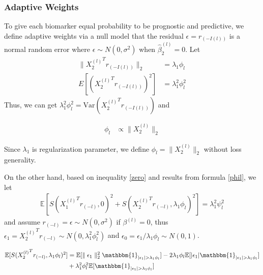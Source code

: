 \documentclass[12pt]{article}
\begin{document}
\subsubsection*{Adaptive Weights}

To give each biomarker equal probability to be prognostic and predictive,
we define adaptive weights via a null model that the residual $\epsilon=r_{(-I(l))}$ 
is a normal random error where $\epsilon\sim N(0,\sigma^2)$ when $\hat{\beta}_2^{(l)}=0$.
Let
\begin{equation} \label{phil}
  \begin{split}
  \parallel {X_2^{(l)}}^T r_{(-I(l))} \parallel_2 & = \lambda_1\phi_l \\
  E[( {X_2^{(l)}}^T r_{(-I(l))})^2] & = \lambda_1^2\phi_l^2
\end{split}
\end{equation}
Thus, we can get $\lambda_1^2\phi_l^2 = \text{Var}( {X_2^{(l)}}^T r_{(-I(l))})$ and 

\begin{align}
  \phi_l & \propto \parallel X_2^{(l)} \parallel_2 
\end{align}

Since $\lambda_1$ is regularization parameter, we define $\phi_l=\parallel X_2^{(l)} \parallel_2$
without loss generality.

On the other hand, based on inequality \ref{zero} and results from formula \ref{phil}, we let
\begin{align}
  \mathbb{E} [ S( {X_1^{(l)}}^T r_{(-l)},0)^2+S( {X_2^{(l)}}^T r_{(-l)},\lambda_1\phi_l)^2  ] = \lambda_1^2\psi_l^2
\end{align}
and assume $ r_{(-l)} = \epsilon  \sim N(0,\sigma^2)$ if $\beta^{(l)}=0$, thus $\epsilon_1= {X_2^{(l)}}^T r_{(-l)} \sim N(0,\lambda_1^2\phi_l^2)$ and 
$\epsilon_0=\epsilon_1/\lambda_1\phi_l\sim N(0,1)$.



\begin{equation} \label{equ_1}
  \begin{split}
 \mathbb{E}[S( {X_2^{(l)}}^T r_{(-l)},\lambda_1\phi_l)^2] &  =  \mathbb{E}[\parallel \epsilon_1 \parallel_2^2 \mathbbm{1}_{|\epsilon_1|>\lambda_1\phi_l}]-2\lambda_1\phi_l\mathbb{E}[|\epsilon_1|\mathbbm{1}_{|\epsilon_1|>\lambda_1\phi_l}]  \\
  &  + \lambda_1^2\phi_l^2\mathbb{E}[\mathbbm{1}_{|\epsilon_1|>\lambda_1\phi_l}] \\
\end{split}
\end{equation}
  
\end{document}
